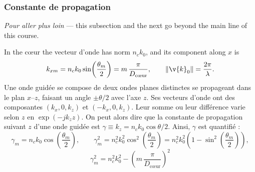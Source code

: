 \subsubsection{Constante de propagation}
\begin{remark}
  \textit{Pour aller plus loin} --- this subsection and the next go beyond the
  main line of this course.
\end{remark}

In the cœur the vecteur d'onde has norm $n_c k_0$, and its component along $x$ is
\begin{equation*}
  k_{xm} = n_c k_0 \sin\!\left(\frac{\theta_m}{2}\right)
         = m\,\frac{\pi}{D_{\text{cœur}}},
  \qquad \|\v{k}_0\| = \frac{2\pi}{\lambda}.
\end{equation*}
Une onde guidée se compose de deux ondes planes distinctes se propageant dans
le plan $x$--$z$, faisant un angle $\pm\theta/2$ avec l'axe $z$. Ses vecteurs
d'onde ont des composantes $(k_x,0,k_z)$ et $(-k_x,0,k_z)$. Leur somme ou leur
différence varie selon $z$ en $\exp(-jk_z z)$. On peut alors dire que la
constante de propagation suivant $z$ d'une onde guidée est
$\gamma \equiv k_z = n_c k_0\cos\theta/2$. Ainsi, $\gamma$ est quantifié :
\begin{equation*}
  \gamma_m = n_c k_0\cos\!\left(\frac{\theta_m}{2}\right),
  \qquad
  \gamma_m^2 = n_c^2 k_0^2\cos^2\!\left(\frac{\theta_m}{2}\right)
             = n_c^2 k_0^2\left(1-\sin^2\!\left(\frac{\theta_m}{2}\right)\right),
\end{equation*}
\begin{equation*}
  \boxed{\;\gamma_m^2 = n_c^2 k_0^2
    - \left(m\,\frac{\pi}{D_{\text{cœur}}}\right)^2\;}
\end{equation*}

\begin{figure}[h!]
  \centering
\end{figure}

